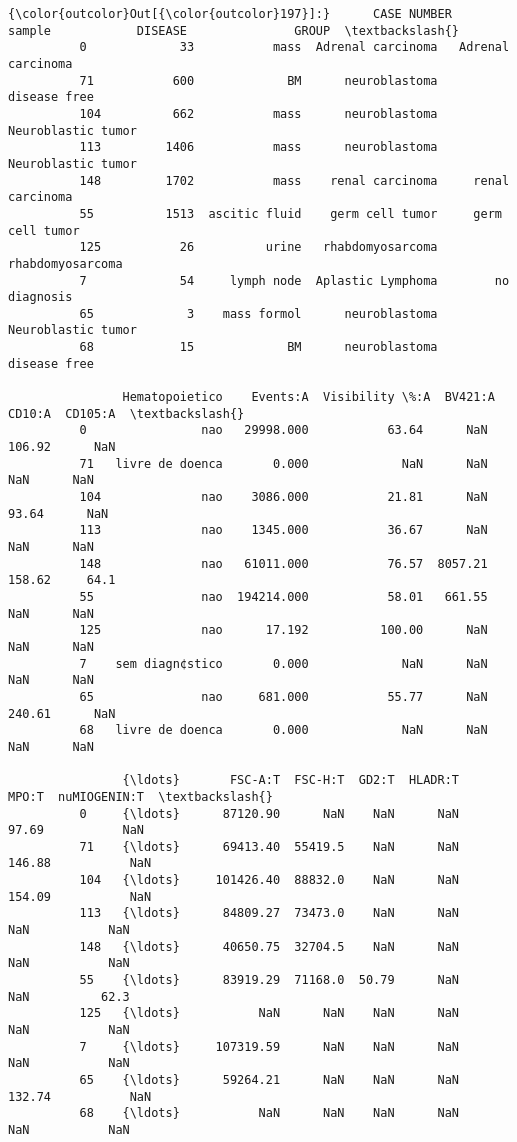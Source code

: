 \documentclass[11pt]{article}
\begin{document}
\begin{Verbatim}[commandchars=\\\{\}]
{\color{outcolor}Out[{\color{outcolor}197}]:}      CASE NUMBER         sample            DISEASE               GROUP  \textbackslash{}
          0             33           mass  Adrenal carcinoma   Adrenal carcinoma   
          71           600             BM      neuroblastoma        disease free   
          104          662           mass      neuroblastoma  Neuroblastic tumor   
          113         1406           mass      neuroblastoma  Neuroblastic tumor   
          148         1702           mass    renal carcinoma     renal carcinoma   
          55          1513  ascitic fluid    germ cell tumor     germ cell tumor   
          125           26          urine   rhabdomyosarcoma    rhabdomyosarcoma   
          7             54     lymph node  Aplastic Lymphoma        no diagnosis   
          65             3    mass formol      neuroblastoma  Neuroblastic tumor   
          68            15             BM      neuroblastoma        disease free   
          
                Hematopoietico    Events:A  Visibility \%:A  BV421:A  CD10:A  CD105:A  \textbackslash{}
          0                nao   29998.000           63.64      NaN  106.92      NaN   
          71   livre de doenca       0.000             NaN      NaN     NaN      NaN   
          104              nao    3086.000           21.81      NaN   93.64      NaN   
          113              nao    1345.000           36.67      NaN     NaN      NaN   
          148              nao   61011.000           76.57  8057.21  158.62     64.1   
          55               nao  194214.000           58.01   661.55     NaN      NaN   
          125              nao      17.192          100.00      NaN     NaN      NaN   
          7    sem diagn¢stico       0.000             NaN      NaN     NaN      NaN   
          65               nao     681.000           55.77      NaN  240.61      NaN   
          68   livre de doenca       0.000             NaN      NaN     NaN      NaN   
          
                {\ldots}       FSC-A:T  FSC-H:T  GD2:T  HLADR:T   MPO:T  nuMIOGENIN:T  \textbackslash{}
          0     {\ldots}      87120.90      NaN    NaN      NaN   97.69           NaN   
          71    {\ldots}      69413.40  55419.5    NaN      NaN  146.88           NaN   
          104   {\ldots}     101426.40  88832.0    NaN      NaN  154.09           NaN   
          113   {\ldots}      84809.27  73473.0    NaN      NaN     NaN           NaN   
          148   {\ldots}      40650.75  32704.5    NaN      NaN     NaN           NaN   
          55    {\ldots}      83919.29  71168.0  50.79      NaN     NaN          62.3   
          125   {\ldots}           NaN      NaN    NaN      NaN     NaN           NaN   
          7     {\ldots}     107319.59      NaN    NaN      NaN     NaN           NaN   
          65    {\ldots}      59264.21      NaN    NaN      NaN  132.74           NaN   
          68    {\ldots}           NaN      NaN    NaN      NaN     NaN           NaN   
          

\end{Verbatim}
\end{document}
